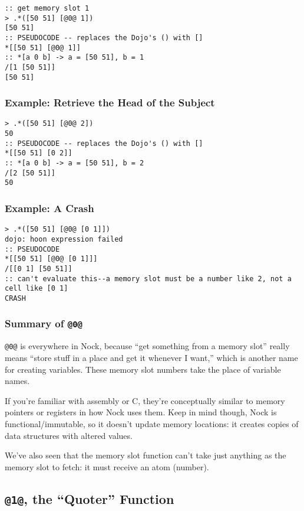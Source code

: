 \documentclass[twoside]{article}
\begin{document}
\begin{lstlisting}[style=listingcode]
:: get memory slot 1
> .*([50 51] [@0@ 1])
[50 51]
:: PSEUDOCODE -- replaces the Dojo's () with []
*[[50 51] [@0@ 1]]
:: *[a 0 b] -> a = [50 51], b = 1
/[1 [50 51]]
[50 51]
\end{lstlisting}

\subsubsection{Example:  Retrieve the Head of the Subject}

\begin{lstlisting}[style=listingcode]
> .*([50 51] [@0@ 2])
50
:: PSEUDOCODE -- replaces the Dojo's () with []
*[[50 51] [0 2]]
:: *[a 0 b] -> a = [50 51], b = 2
/[2 [50 51]]
50
\end{lstlisting}

\subsubsection{Example:  A Crash}

\begin{lstlisting}[style=listingcode]
> .*([50 51] [@0@ [0 1]])
dojo: hoon expression failed
:: PSEUDOCODE
*[[50 51] [@0@ [0 1]]]
/[[0 1] [50 51]]
:: can't evaluate this--a memory slot must be a number like 2, not a cell like [0 1]
CRASH
\end{lstlisting}

\subsubsection{Summary of \lstinline[style=inlinecode]{@0@}}

\lstinline[style=inlinecode]{@0@} is everywhere in Nock, because “get something from a memory slot” really means “store stuff in a place and get it whenever I want,” which is another name for creating variables. These memory slot numbers take the place of variable names.

If you're familiar with assembly or C, they're conceptually similar to memory pointers or registers in how Nock uses them. Keep in mind though, Nock is functional/immutable, so it doesn't update memory locations: it creates copies of data structures with altered values.

We've also seen that the memory slot function can't take just anything as the memory slot to fetch: it must receive an atom (number).

\subsection{\lstinline[style=inlinecode]{@1@}, the “Quoter” Function}
\label{sxn:nock1}
\end{document}
